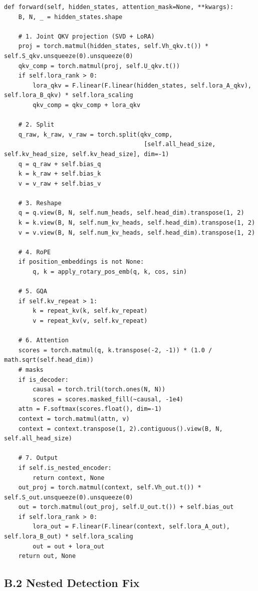 \begin{lstlisting}
def forward(self, hidden_states, attention_mask=None, **kwargs):
    B, N, _ = hidden_states.shape
    
    # 1. Joint QKV projection (SVD + LoRA)
    proj = torch.matmul(hidden_states, self.Vh_qkv.t()) * self.S_qkv.unsqueeze(0).unsqueeze(0)
    qkv_comp = torch.matmul(proj, self.U_qkv.t())
    if self.lora_rank > 0:
        lora_qkv = F.linear(F.linear(hidden_states, self.lora_A_qkv), self.lora_B_qkv) * self.lora_scaling
        qkv_comp = qkv_comp + lora_qkv
    
    # 2. Split
    q_raw, k_raw, v_raw = torch.split(qkv_comp, 
                                       [self.all_head_size, self.kv_head_size, self.kv_head_size], dim=-1)
    q = q_raw + self.bias_q
    k = k_raw + self.bias_k
    v = v_raw + self.bias_v
    
    # 3. Reshape
    q = q.view(B, N, self.num_heads, self.head_dim).transpose(1, 2)
    k = k.view(B, N, self.num_kv_heads, self.head_dim).transpose(1, 2)
    v = v.view(B, N, self.num_kv_heads, self.head_dim).transpose(1, 2)
    
    # 4. RoPE
    if position_embeddings is not None:
        q, k = apply_rotary_pos_emb(q, k, cos, sin)
    
    # 5. GQA
    if self.kv_repeat > 1:
        k = repeat_kv(k, self.kv_repeat)
        v = repeat_kv(v, self.kv_repeat)
    
    # 6. Attention
    scores = torch.matmul(q, k.transpose(-2, -1)) * (1.0 / math.sqrt(self.head_dim))
    # masks
    if is_decoder:
        causal = torch.tril(torch.ones(N, N))
        scores = scores.masked_fill(~causal, -1e4)
    attn = F.softmax(scores.float(), dim=-1)
    context = torch.matmul(attn, v)
    context = context.transpose(1, 2).contiguous().view(B, N, self.all_head_size)
    
    # 7. Output
    if self.is_nested_encoder:
        return context, None
    out_proj = torch.matmul(context, self.Vh_out.t()) * self.S_out.unsqueeze(0).unsqueeze(0)
    out = torch.matmul(out_proj, self.U_out.t()) + self.bias_out
    if self.lora_rank > 0:
        lora_out = F.linear(F.linear(context, self.lora_A_out), self.lora_B_out) * self.lora_scaling
        out = out + lora_out
    return out, None
\end{lstlisting}

\subsection{B.2 Nested Detection Fix}

